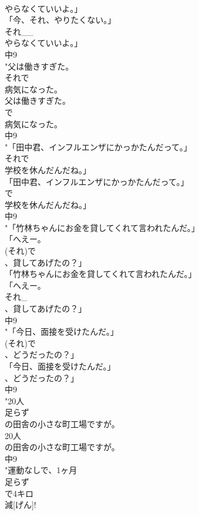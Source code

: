 \documentclass[8pt]{extreport}
\begin{document}
\begin{CJK}{UTF8}{min}
\\	やらなくていいよ。」
\\	「今、それ、やりたくない。」
\\	それ__
\\	やらなくていいよ。」
\\	中9
\\	"父は働きすぎた。
\\	それで
\\	病気になった。
\\	父は働きすぎた。
\\	で
\\	病気になった。
\\	中9
\\	"「田中君、インフルエンザにかっかたんだって。」
\\	それで
\\	学校を休んだんだね。」
\\	「田中君、インフルエンザにかっかたんだって。」
\\	で
\\	学校を休んだんだね。」
\\	中9
\\	"「竹林ちゃんにお金を貸してくれて言われたんだ。」
\\	「へえー。
\\	(それ)で
\\	、貸してあげたの？」
\\	「竹林ちゃんにお金を貸してくれて言われたんだ。」
\\	「へえー。
\\	それ_
\\	、貸してあげたの？」
\\	中9
\\	"「今日、面接を受けたんだ。」
\\	(それ)で
\\	、どうだったの？」
\\	「今日、面接を受けたんだ。」
\\	、どうだったの？」
\\	中9
\\	"20人
\\	足らず
\\	の田舎の小さな町工場ですが。
\\	20人
\\	の田舎の小さな町工場ですが。
\\	中9
\\	"運動なしで、1ヶ月
\\	足らず
\\	で4キロ
\\	減[げん]!

\end{CJK}
\end{document}
